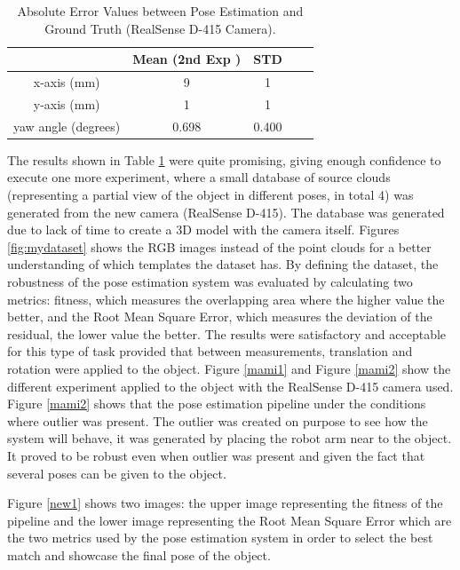 \begin{table}[ht]
\renewcommand{\arraystretch}{1.3}
\caption{Absolute Error Values between Pose Estimation and Ground Truth (RealSense D-415 Camera).}
\label{abso}
\centering
\begin{tabular}{|c|c|c|c|c|}
\hline
  & Mean (2nd Exp )& STD \\
\hline
x-axis (mm) & 9 & 1
 \\
\hline
y-axis (mm) & 1 & 1  \\
\hline
yaw angle (degrees)& 0.698 & 0.400 \\
\hline
\end{tabular}
\end{table}

The results shown in Table \ref{abso} were quite promising, giving enough confidence to execute one more experiment, where a small database of source clouds (representing a partial view of the object in different poses, in total 4) was generated from the new camera (RealSense D-415). The database was generated due to lack of  time to create a 3D model with the camera itself. Figures \ref{fig:mydataset} shows the RGB images instead of the point clouds for a better understanding of which templates the dataset has. By defining the dataset, the robustness of the pose estimation system was evaluated by calculating two metrics: fitness, which measures the overlapping area where the higher value the better, and the Root Mean Square Error, which measures the deviation of the residual, the lower value the better. The results were satisfactory and acceptable for this type of task provided that between measurements, translation and rotation were applied to the object. Figure \ref{mami1} and Figure \ref{mami2} show the different experiment applied to the object with the RealSense D-415 camera used. Figure \ref{mami2} shows that the pose estimation pipeline under the conditions where outlier was present. The outlier was created on purpose to see how the system will behave, it was generated by placing the robot arm near to the object. It proved to be robust even when outlier was present and given the fact that several poses can be given to the object.  

Figure \ref{new1} shows two images: the upper image representing the fitness of the pipeline and the lower image representing the Root Mean Square Error which are the two metrics used by the pose estimation system in order to select the best match and showcase the final pose of the object.

